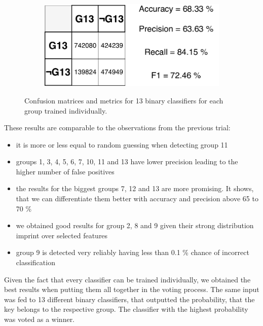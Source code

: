 \begin{figure}[H]
\vspace{3mm}
\begin{subfigure}{.33\textwidth}
  \centering
  \includegraphics[width=\textwidth]{tex/images/results/rese_g13_512}  
\end{subfigure}%

\caption{Confusion matrices and metrics for 13 binary classifiers for each group trained individually.}

\end{figure}

\noindent
These results are comparable to the observations from the previous trial:

\begin{itemize}

\item it is more or less equal to random guessing when detecting group 11
\item groups 1, 3, 4, 5, 6, 7, 10, 11 and 13 have lower precision leading to the higher number of false positives
\item the results for the biggest groups 7, 12 and 13 are more promising. It shows, that we can differentiate them better with accuracy and precision above 65 to 70 \%
\item we obtained good results for group 2, 8 and 9 given their strong distribution imprint over selected features
\item group 9 is detected very reliably having less than 0.1 \% chance of incorrect classification

\end{itemize}

Given the fact that every classifier can be trained individually, we obtained the best results when putting them all together in the voting process. The same input was fed to 13 different binary classifiers, that outputted the probability, that the key belongs to the respective group. The classifier with the highest probability was voted as a winner.


